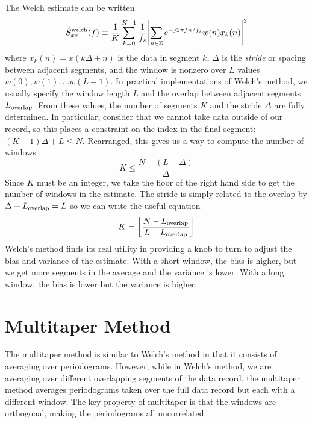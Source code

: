 \documentclass[twocolumn]{gwclass}
\begin{document}
The Welch estimate can be written
$$ \hat{S}_{xx}^{\text{\normalfont{welch}}}(f) \equiv \frac{1}{K}\sum_{k=0}^{K-1}\frac{1}{f_s}\abs{\sum_{n\in\mathbb{Z}}e^{-j2\pi f n/f_s} w(n)x_k(n) }^2 $$
where $x_k(n)=x(k\Delta + n)$ is the data in segment $k$, $\Delta$ is the \emph{stride} or spacing between adjacent segments, and the window is nonzero over $L$ values $w(0),w(1),\dots w(L-1)$. In practical implementations of Welch's method, we usually specify the window length $L$ and the overlap between adjacent segments $L_{\text{\normalfont{overlap}}}$. From these values, the number of segments $K$ and the stride $\Delta$ are fully determined. In particular, consider that we cannot take data outside of our record, so this places a constraint on the index in the final segment: $(K-1)\Delta + L \leq N$. Rearranged, this gives us a way to compute the number of windows
$$ K \leq \frac{N - (L - \Delta)}{\Delta} $$
Since $K$ must be an integer, we take the floor of the right hand side to get the number of windows in the estimate. The stride is simply related to the overlap by $\Delta + L_{\text{\normalfont{overlap}}} =L$ so we can write the useful equation
$$ K = \left\lfloor \frac{N - L_{\text{\normalfont{overlap}}}}{L - L_{\text{\normalfont{overlap}}}} \right\rfloor $$
Welch's method finds its real utility in providing a knob to turn to adjust the bias and variance of the estimate. With a short window, the bias is higher, but we get more segments in the average and the variance is lower. With a long window, the bias is lower but the variance is higher. 

\section{Multitaper Method}
The multitaper method is similar to Welch's method in that it consists of averaging over periodograms. However, while in Welch's method, we are averaging over different overlapping segments of the data record, the multitaper method averages periodograms taken over the full data record but each with a different window. The key property of multitaper is that the windows are orthogonal, making the periodograms all uncorrelated. 
\end{document}
